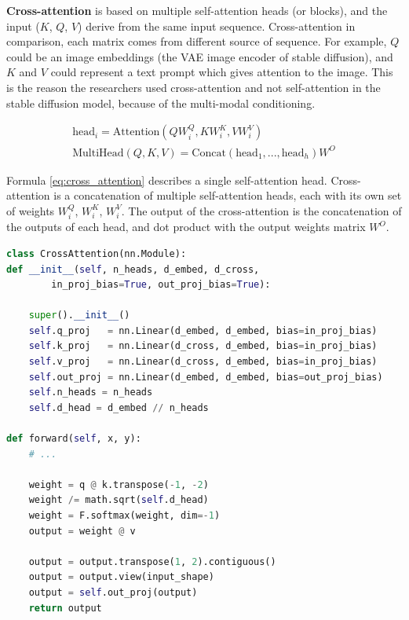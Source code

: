 \textbf{Cross-attention} is based on multiple self-attention heads (or blocks), and the input ($K$, $Q$, $V$) derive from the same input sequence. Cross-attention in comparison, each matrix comes from different source of sequence. For example, $Q$ could be an image embeddings (the VAE image encoder of stable diffusion), and $K$ and $V$ could represent a text prompt which gives attention to the image. This is the reason the researchers used cross-attention and not self-attention in the stable diffusion model, because of the multi-modal conditioning.

\begin{equation}
    \begin{aligned}
        \text{head}_i = \text{Attention}(QW_i^Q, KW_i^K, VW_i^V)  \\
        \text{MultiHead}(Q, K, V) = \text{Concat}(\text{head}_1, ..., \text{head}_h)W^O
    \end{aligned}
    \label{eq:cross_attention}
\end{equation}

Formula \ref{eq:cross_attention} describes a single self-attention head. Cross-attention is a concatenation of multiple self-attention heads, each with its own set of weights $W_i^Q$, $W_i^K$, $W_i^V$. The output of the cross-attention is the concatenation of the outputs of each head, and dot product with the output weights matrix $W^O$.



\begin{lstlisting}[language=Python, caption={Cross-attention PyTorch code snippet. The '@' operation is a dot product.}, label={lst:cross_attention_stable_diffusion}]
class CrossAttention(nn.Module):
def __init__(self, n_heads, d_embed, d_cross, 
        in_proj_bias=True, out_proj_bias=True):

    super().__init__()
    self.q_proj   = nn.Linear(d_embed, d_embed, bias=in_proj_bias)
    self.k_proj   = nn.Linear(d_cross, d_embed, bias=in_proj_bias)
    self.v_proj   = nn.Linear(d_cross, d_embed, bias=in_proj_bias)
    self.out_proj = nn.Linear(d_embed, d_embed, bias=out_proj_bias)
    self.n_heads = n_heads
    self.d_head = d_embed // n_heads

def forward(self, x, y):
    # ...

    weight = q @ k.transpose(-1, -2)
    weight /= math.sqrt(self.d_head)
    weight = F.softmax(weight, dim=-1)
    output = weight @ v

    output = output.transpose(1, 2).contiguous()
    output = output.view(input_shape)
    output = self.out_proj(output)
    return output
\end{lstlisting}

